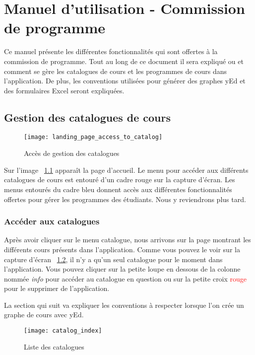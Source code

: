 \label{AppendixA}
\chapter{Manuel d'utilisation - Commission de programme}
Ce manuel présente les différentes fonctionnalités qui sont offertes à la commission de programme. Tout au long de ce document il sera expliqué ou et comment se gère les catalogues de cours et les programmes de cours dans l'application. De plus, les conventions utilisées pour générer des graphes yEd et des formulaires Excel seront expliquées. 
\section{Gestion des catalogues de cours}
\begin{figure}[htb]
\centering
\texttt{[image: landing\_page\_access\_to\_catalog]}
\caption{Accès de gestion des catalogues}
\label{fig:landing_page_catalog}
\end{figure}

Sur l'image ~\ref{fig:landing_page_catalog} apparaît la page d'accueil. Le menu pour accéder aux différents catalogues de cours est entouré d'un cadre rouge sur la capture d'écran. Les menus entourés du cadre bleu donnent accès aux différentes fonctionnalités offertes pour gérer les programmes des étudiants. Nous y reviendrons plus tard. 

\subsection{Accéder aux catalogues}
Après avoir cliquer sur le menu catalogue, nous arrivons sur la page montrant les différents cours présents dans l'application. Comme vous pouvez le voir sur la capture d'écran ~\ref{fig:catalog_index}, il n'y a qu'un seul catalogue pour le moment dans l'application. Vous pouvez cliquer sur la petite loupe en dessous de la colonne nommée \textit{info} pour accéder au catalogue en question ou sur la petite croix \textcolor{red}{rouge} pour le supprimer de l'application.

La section qui suit va expliquer les conventions à respecter lorsque l'on crée un graphe de cours avec yEd.

\begin{figure}[htb]
\centering
\caption{Liste des catalogues}
\label{fig:catalog_index}
\texttt{[image: catalog\_index]}
\end{figure}

